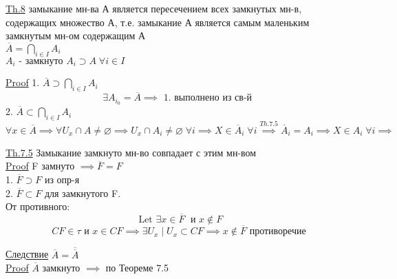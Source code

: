 \documentclass[a4paper]{article}
\begin{document}
\begin{tcolorbox}
\underline{Th.8} замыкание мн-ва А является пересечением всех замкнутых мн-в,
содержащих множество А, т.е. замыкание А является самым маленьким замкнутым мн-ом
содержащим А \\
$ \overline{A} = \bigcap\limits_{i \in I} A_i $ \\
$ A_i \text{ - замкнуто } A_i \supset A  \; \forall i \in I $ 

\underline{Proof} 1. $ \overline{A} \supset \bigcap\limits_{i \in I} A_i$ 
\[
    \exists A_{i_0} = \overline{A} \implies \text{ 1. выполнено из св-й }
\]
2. $ \overline{A} \subset \bigcap\limits_{i \in I} A_i$ \\
\[
    \forall x \in \overline{A} \implies \forall U_x \cap A \neq \varnothing 
    \implies U_x \cap A_i \neq \varnothing \; \forall i \implies
    X \in \overline{A}_i \; \forall i \stackrel{Th.7.5}{\implies} \overline{A}_i = 
    A_i \implies X \in A_i \; \forall i \implies 
\]
\end{tcolorbox}

\begin{tcolorbox}
\underline{Th.7.5} Замыкание замкнуто мн-во совпадает с этим мн-вом \\

\underline{Proof} F замнуто $ \implies \overline{F} = F $  \\
1. $ \overline{F} \supset F $ из опр-я\\
2. $ \overline{F} \subset F $ для замкнутого F.\\
От противного: \\
\[
    \text{ Let } \exists x \in \overline{F} \; \text{ и } x \notin F
\]
\[
    CF \in \tau \text{ и } x\in CF \implies \exists U_x \; | \; U_x \subset CF
    \implies x \notin \overline{F} \text{ противоречие}
\]
\end{tcolorbox}

\underline{Следствие} $ \overline{A} = \overline{\overline{A}} $ \\
\underline{Proof} $ \overline{A} $ замкнуто $ \implies $ по Теореме 7.5
\end{document}
